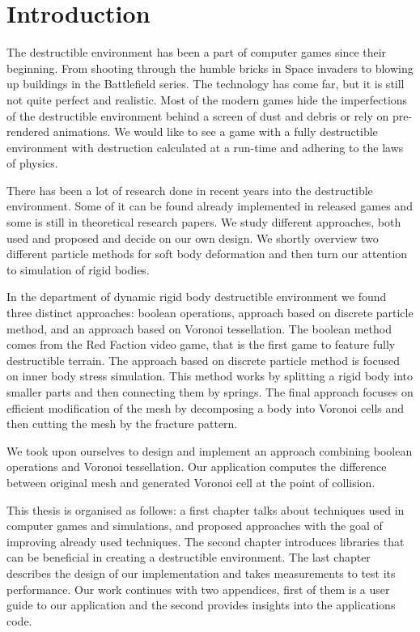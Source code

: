\chapter*{Introduction}

The destructible environment has been a part of computer games since their beginning. From shooting through the humble bricks in Space invaders to blowing up buildings in the Battlefield series. The technology has come far, but it is still not quite perfect and realistic. Most of the modern games hide the imperfections of the destructible environment behind a screen of dust and debris or rely on pre-rendered animations. We would like to see a game with a fully destructible environment with destruction calculated at a run-time and adhering to the laws of physics.

There has been a lot of research done in recent years into the destructible environment. Some of it can be found already implemented in released games and some is still in theoretical research papers. We study different approaches, both used and proposed and decide on our own design. We shortly overview two different particle methods for soft body deformation and then turn our attention to simulation of rigid bodies. 

In the department of dynamic rigid body destructible environment we found three distinct approaches: boolean operations, approach based on discrete particle method, and an approach based on Voronoi tessellation. The boolean method comes from the Red Faction video game, that is the first game to feature fully destructible terrain. The approach based on discrete particle method is focused on inner body stress simulation. This method works by splitting a rigid body into smaller parts and then connecting them by springs. The final approach focuses on efficient modification of the mesh by decomposing a body into Voronoi cells and then cutting the mesh by the fracture pattern.

We took upon ourselves to design and implement an approach combining boolean operations and Voronoi tessellation. Our application computes the difference between original mesh and generated Voronoi cell at the point of collision.

This thesis is organised as follows: a first chapter talks about techniques used in computer games and simulations, and proposed approaches with the goal of improving already used techniques. The second chapter introduces libraries that can be beneficial in creating a destructible environment. The last chapter describes the design of our implementation and takes measurements to test its performance. Our work continues with two appendices, first of them is a user guide to our application and the second provides insights into the applications code. 

